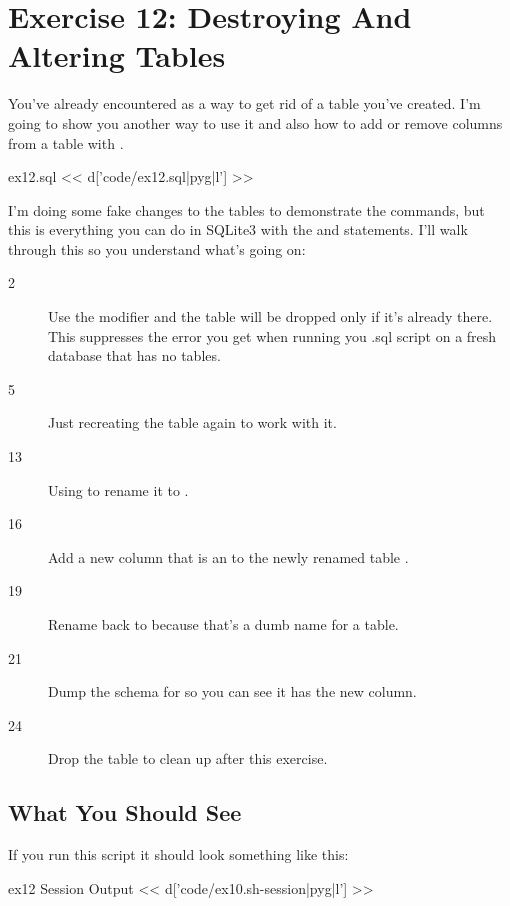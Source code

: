 \chapter{Exercise 12: Destroying And Altering Tables}

You've already encountered  as a way to get rid of
a table you've created.  I'm going to show you another way to use it
and also how to add or remove columns from a table with .

\begin{code}{ex12.sql}
<< d['code/ex12.sql|pyg|l'] >>
\end{code}

I'm doing some fake changes to the tables to demonstrate the commands, but
this is everything you can do in SQLite3 with the  and
 statements.  I'll walk through this so you understand
what's going on:

\begin{description}
\item[2] Use the  modifier and the table will be dropped
    only if it's already there.  This suppresses the error you get when
    running you .sql script on a fresh database that has no tables.
\item[5] Just recreating the table again to work with it.
\item[13] Using  to rename it to .
\item[16] Add a new column  that is an  to
    the newly renamed table .
\item[19] Rename  back to  because that's
    a dumb name for a table.
\item[21] Dump the schema for  so you can see it has the
    new  column.
\item[24] Drop the table to clean up after this exercise.
\end{description}

\section{What You Should See}

If you run this script it should look something like this:

\begin{code}{ex12 Session Output}
<< d['code/ex10.sh-session|pyg|l'] >>
\end{code}

